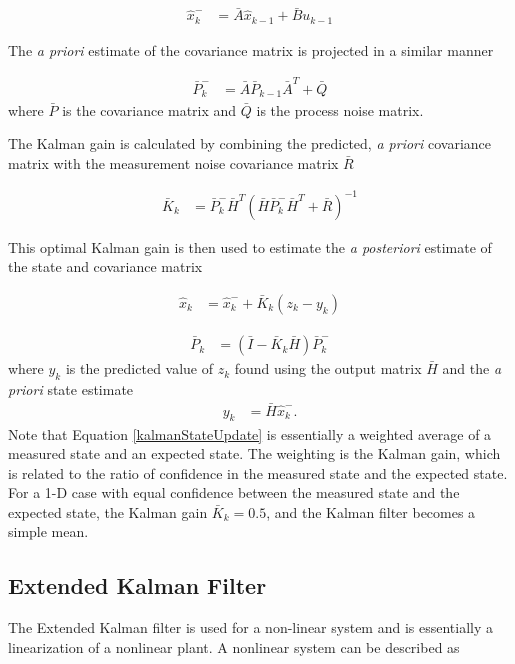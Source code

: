 \begin{align}
\hat{x}^-_k &= \bar{A}\hat{x}_{k-1}+\bar{B}u_{k-1}
\end{align}

The \textit{a priori} estimate of the covariance matrix is projected in a similar manner

\begin{align}
\bar{P}^-_k &= \bar{A}\bar{P}_{k-1}\bar{A}^T+\bar{Q}
\end{align}
\noindent
where $\bar{P}$ is the covariance matrix and $\bar{Q}$ is the process noise matrix.

The Kalman gain is calculated by combining the predicted, \textit{a priori} covariance matrix with the measurement noise covariance matrix $\bar{R}$

\begin{align}
\bar{K}_k &=\bar{P}^-_k\bar{H}^T(\bar{H}\bar{P}^-_k\bar{H}^T + \bar{R})^{-1}
\end{align}

This optimal Kalman gain is then used to estimate the \textit{a posteriori} estimate of the state and covariance matrix

\begin{align}
\label{kalmanStateUpdate}
\hat{x}_k &=\hat{x}^-_k+\bar{K}_k(z_k-y_k)
\end{align}

\begin{align}
\bar{P}_k &= (\bar{I}-\bar{K}_k\bar{H})\bar{P}^-_k
\end{align}
\noindent
where $y_k$ is the predicted value of $z_k$ found using the output matrix $\bar{H}$ and the \textit{a priori} state estimate
\begin{align}
y_k &= \bar{H}\hat{x}^-_k.
\end{align}
Note that Equation \ref{kalmanStateUpdate} is essentially a weighted average of a measured state and an expected state. The weighting is the Kalman gain, which is related to the ratio of confidence in the measured state and the expected state. For a 1-D case with equal confidence between the measured state and the expected state, the Kalman gain $\bar{K}_k = 0.5$, and the Kalman filter becomes a simple mean.


\subsection*{Extended Kalman Filter}
\label{EKFTheory}
The Extended Kalman filter is used for a non-linear system and is essentially a linearization of a nonlinear plant. A nonlinear system can be described as \cite{welch1995introduction}

